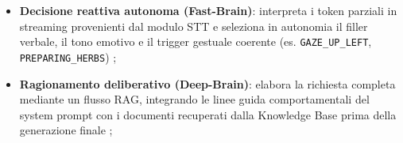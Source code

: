 \documentclass[11pt,a4paper]{article}
\begin{document}
\begin{itemize}
    \item \textbf{Decisione reattiva autonoma (Fast-Brain)}: interpreta i token parziali in streaming provenienti dal modulo STT e seleziona in autonomia il filler verbale, il tono emotivo e il trigger gestuale coerente (es. \texttt{GAZE\_UP\_LEFT}, \texttt{PREPARING\_HERBS}) \cite{projectspec,persona};
    \item \textbf{Ragionamento deliberativo (Deep-Brain)}: elabora la richiesta completa mediante un flusso RAG, integrando le linee guida comportamentali del system prompt con i documenti recuperati dalla Knowledge Base prima della generazione finale \cite{projectspec};

\end{itemize}
\end{document}
